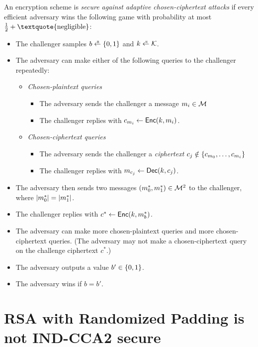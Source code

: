 \begin{definition}\label{defn:cca}
An encryption scheme is \emph{secure against 
adaptive chosen-ciphertext attacks}
if every efficient adversary wins the following 
game with probability at most $\tfrac{1}{2} + \text{\textquote{negligible}}$:

  \begin{itemize}[noitemsep]
		\item The challenger samples $b \rgets \bin$ and $k \rgets \calK$.
    \item The adversary can make either of the following queries to the challenger
      repeatedly:
      \begin{itemize}
    \item \emph{Chosen-plaintext queries}
          \begin{itemize}
            \item The adversary sends the challenger a message $m_i \in \mathcal{M}$
						\item The challenger replies with $c_{m_i} \gets \mathsf{Enc}(k, m_i)$.
          \end{itemize}
    \item \emph{Chosen-ciphertext queries}
          \begin{itemize}
						\item The adversary sends the challenger a \emph{ciphertext} $c_j \notin \left\{ c_{m_0}, \ldots, c_{m_i} \right\}$
						\item The challenger replies with $m_{c_j} \gets \mathsf{Dec}(k, c_j)$.
          \end{itemize}
      \end{itemize}
    \item The adversary then sends two messages $(m^*_0, m^*_1) \in \mathcal{M}^2$ to the challenger,
          where $\left| m^*_0 \right| = \left| m^*_1 \right|$.
    \item The challenger replies with $c^* \gets \mathsf{Enc}(k, m^*_b)$.
    \item The adversary can make more chosen-plaintext queries
      and more chosen-ciphertext queries. (The adversary may not
      make a chosen-ciphertext query on the challenge ciphertext $c^*$.)
		\item The adversary outputs a value $b' \in \{0,1\}$.
    \item The adversary wins if $b=b'$. 
	\end{itemize}
\end{definition}

\section{RSA with Randomized Padding is not IND-CCA2 secure}

